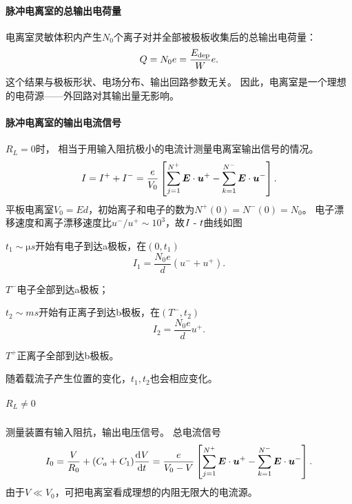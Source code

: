 \paragraph{脉冲电离室的总输出电荷量}
电离室灵敏体积内产生$N_0$个离子对并全部被极板收集后的总输出电荷量：
\[
	Q=N_0e=\frac{E_{\mathrm{dep}}}We.
\]
这个结果与极板形状、电场分布、输出回路参数无关。
因此，电离室是一个理想的电荷源——外回路对其输出量无影响。
\paragraph{脉冲电离室的输出电流信号}$R_L=0$时，
相当于用输入阻抗极小的电流计测量电离室输出信号的情况。%
\[
	I=I^++I^-=\frac e{V_0}\left[\sum_{j=1}^{N^+}\bm E\cdot\bm u^+-\sum_{k=1}^{N^-}\bm E\cdot\bm u^-\right].
\]
平板电离室$V_0=Ed$，初始离子和电子的数为$N^+(0)=N^-(0)=N_0$。
电子漂移速度和离子漂移速度比$u^-/u^+\sim 10^3$，故$I~\text{-}~ t$曲线如图
\begin{center}
\end{center}
\begin{compactenum}
	\item $t_1\sim\si{\micro s}$开始有电子到达a极板，在$(0,t_1)$
	\[
		I_1=\frac{N_0e}d(u^-+u^+).
	\]
	\item $T^-$电子全部到达a极板；
	\item $t_2\sim\si{ms}$开始有正离子到达b极板，在$(T^-,t_2)$
	\[
		I_2=\frac{N_0e}du^+.
	\]
	\item $T^+$正离子全部到达b极板。
\end{compactenum}
随着载流子产生位置的变化，$t_1,t_2$也会相应变化。
\subparagraph{$R_L\neq 0$}
测量装置有输入阻抗，输出电压信号。
总电流信号
\[
	I_0=\frac V{R_0}+(C_a+C_1)\frac{\mathrm{d}^{{}}V}{\mathrm{d}{t}^{{}}}=\frac e{V_0-V}\left[\sum_{j=1}^{N^+}\bm E\cdot\bm u^+-\sum_{k=1}^{N^-}\bm E\cdot\bm u^-\right].
\]
由于$V\ll V_0$，可把电离室看成理想的内阻无限大的电流源。

